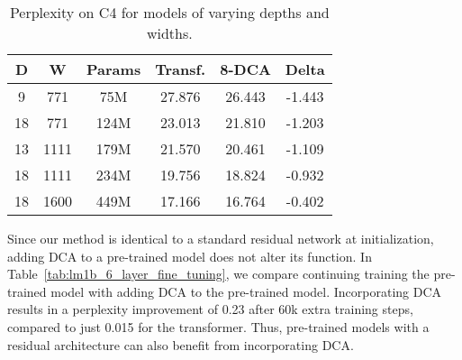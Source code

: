 \begin{table}[h]
    \vskip -0.1in
    \caption{Perplexity on C4 for models of varying depths and widths.}
    \label{tab:c4-scaling}
    \vskip 0.15in
    \begin{center}
    \begin{small}
    \begin{sc}
    \begin{tabular}{cc|cccc}
        \toprule
        D & W & Params & Transf. & 8-DCA & Delta  \\
        \midrule
        9 & 771 & 75M & 27.876 & 26.443 & -1.443 \\
        18 & 771 & 124M & 23.013 & 21.810 & -1.203 \\
        13 & 1111 & 179M & 21.570 & 20.461 & -1.109 \\
        18 & 1111 & 234M & 19.756 & 18.824 & -0.932 \\
        18 & 1600 & 449M & 17.166 & 16.764 & -0.402 \\
        \bottomrule
    \end{tabular}
    \end{sc}
    \end{small}
    \end{center}
    \vskip -0.1in
\end{table}



 Since our method is identical to a standard residual network at initialization, adding DCA to a pre-trained model does not alter its function. In Table~\ref{tab:lm1b_6_layer_fine_tuning}, we compare continuing training the pre-trained model with adding DCA to the pre-trained model. Incorporating DCA results in a perplexity improvement of 0.23 after 60k extra training steps, compared to just 0.015 for the transformer. Thus, pre-trained models with a residual architecture can also benefit from incorporating DCA. 


